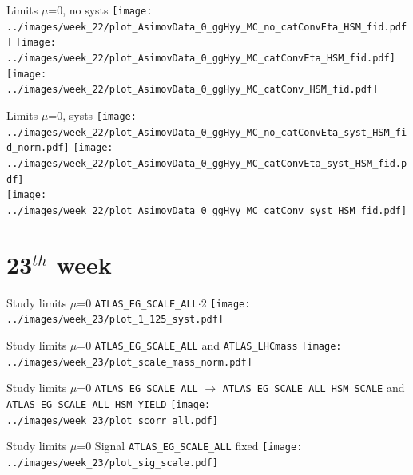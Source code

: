 \documentclass[10pt,UKenglish, leqno, xcolor = dvipsnames]{beamer}
\begin{document}
		\begin{frame}{Limits $\mu$=0, no systs}
			\vfill
			\centering
			\texttt{[image: ../images/week\_22/plot\_AsimovData\_0\_ggHyy\_MC\_no\_catConvEta\_HSM\_fid.pdf]}
			\texttt{[image: ../images/week\_22/plot\_AsimovData\_0\_ggHyy\_MC\_catConvEta\_HSM\_fid.pdf]}\\
			\texttt{[image: ../images/week\_22/plot\_AsimovData\_0\_ggHyy\_MC\_catConv\_HSM\_fid.pdf]}
			\vfill
		\end{frame}
	
		\begin{frame}{Limits $\mu$=0, systs}
			\vfill
			\centering
			\texttt{[image: ../images/week\_22/plot\_AsimovData\_0\_ggHyy\_MC\_no\_catConvEta\_syst\_HSM\_fid\_norm.pdf]}
			\texttt{[image: ../images/week\_22/plot\_AsimovData\_0\_ggHyy\_MC\_catConvEta\_syst\_HSM\_fid.pdf]}\\
			\texttt{[image: ../images/week\_22/plot\_AsimovData\_0\_ggHyy\_MC\_catConv\_syst\_HSM\_fid.pdf]}
			\vfill
		\end{frame}
	
	\section{23$^{th}$ week}
	\SectionPage
		
		\begin{frame}{Study limits $\mu$=0}
			\vfill
			\texttt{ATLAS\_EG\_SCALE\_ALL}$\cdot$2
			\centering
			\texttt{[image: ../images/week\_23/plot\_1\_125\_syst.pdf]}
			\vfill
		\end{frame}
		
		\begin{frame}{Study limits $\mu$=0}
			\vfill
			\texttt{ATLAS\_EG\_SCALE\_ALL} and \texttt{ATLAS\_LHCmass}
			\centering
			\texttt{[image: ../images/week\_23/plot\_scale\_mass\_norm.pdf]}
			\vfill
		\end{frame}
	
		\begin{frame}{Study limits $\mu$=0}
			\vfill
			\texttt{ATLAS\_EG\_SCALE\_ALL} $\to$ \texttt{ATLAS\_EG\_SCALE\_ALL\_HSM\_SCALE} and \texttt{ATLAS\_EG\_SCALE\_ALL\_HSM\_YIELD}
			\centering
			\texttt{[image: ../images/week\_23/plot\_scorr\_all.pdf]}
			\vfill
		\end{frame}
	
		\begin{frame}{Study limits $\mu$=0}
			\vfill
			Signal \texttt{ATLAS\_EG\_SCALE\_ALL} fixed
			\centering
			\texttt{[image: ../images/week\_23/plot\_sig\_scale.pdf]}
			\vfill
		\end{frame}
	
\end{document}
